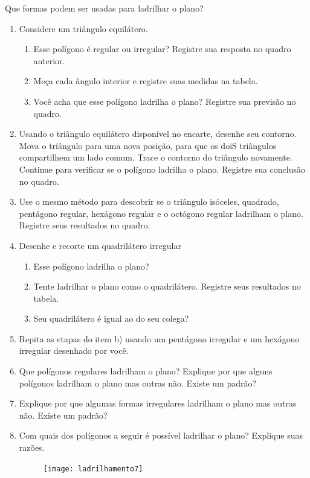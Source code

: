 \begin{task}{Que formas podem ser usadas para ladrilhar o plano?}
\begin{enumerate}
\item Considere um triângulo equilátero. 
	\begin{enumerate}
		\item Esse polígono é regular ou irregular? Registre sua resposta no quadro anterior.
		\item Meça cada ângulo interior e registre suas medidas na tabela.
		\item Você acha que esse polígono ladrilha o plano? Registre sua previsão no quadro.
	\end{enumerate}
\item Usando o triângulo equilátero disponível no encarte, desenhe seu contorno. Mova o triângulo para uma nova posição, para que os doiS triângulos compartilhem um lado comum. Trace o contorno do triângulo novamente. Continue para verificar se o polígono ladrilha o plano. Registre sua conclusão no quadro.
\item Use o mesmo método para descobrir se o triângulo isóceles, quadrado, pentágono regular, hexágono regular e o octógono regular ladrilham o plano. Registre seus resultados no quadro.

\item Desenhe e recorte um quadrilátero irregular
	\begin{enumerate}
		\item Esse polígono ladrilha o plano?
		\item Tente ladrilhar o plano como o quadrilátero. Registre seus resultados no tabela.
		\item Seu quadrilátero é igual ao do seu colega?
	\end{enumerate}
\item Repita as etapas do item b) usando um pentágono irregular e um hexágono irregular desenhado por você.



\item Que polígonos regulares ladrilham o plano? Explique por que alguns polígonos ladrilham o plano mas outras não. Existe um padrão?
\item Explique por que algumas formas irregulares ladrilham o plano mas outras não. Existe um padrão?



\item Com quais dos polígonos a seguir é possível ladrilhar o plano? Explique suas razões.

\begin{figure}[H]
\centering
\texttt{[image: ladrilhamento7]}
\end{figure}
\end{enumerate}

\end{task}


